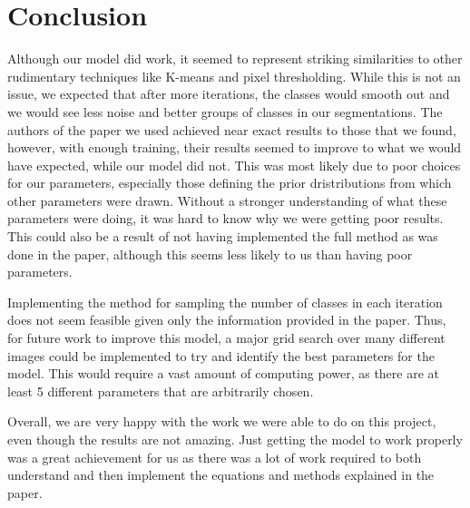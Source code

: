 \documentclass[11pt]{article}
\begin{document}
\section{Conclusion}
Although our model did work, it seemed to represent striking similarities to other rudimentary techniques like K-means and pixel thresholding.
While this is not an issue, we expected that after more iterations, the classes would smooth out and we would see less noise and better groups of classes in our segmentations.
The authors of the paper we used achieved near exact results to those that we found, however, with enough training, their results seemed to improve to what we would have expected, while our model did not.
This was most likely due to poor choices for our parameters, especially those defining the prior dristributions from which other parameters were drawn.
Without a stronger understanding of what these parameters were doing, it was hard to know why we were getting poor results.
This could also be a result of not having implemented the full method as was done in the paper, although this seems less likely to us than having poor parameters.

Implementing the method for sampling the number of classes in each iteration does not seem feasible given only the information provided in the paper.
Thus, for future work to improve this model, a major grid search over many different images could be implemented to try and identify the best parameters for the model.
This would require a vast amount of computing power, as there are at least 5 different parameters that are arbitrarily chosen.

Overall, we are very happy with the work we were able to do on this project, even though the results are not amazing.
Just getting the model to work properly was a great achievement for us as there was a lot of work required to both understand and then implement the equations and methods explained in the paper.
\end{document}
